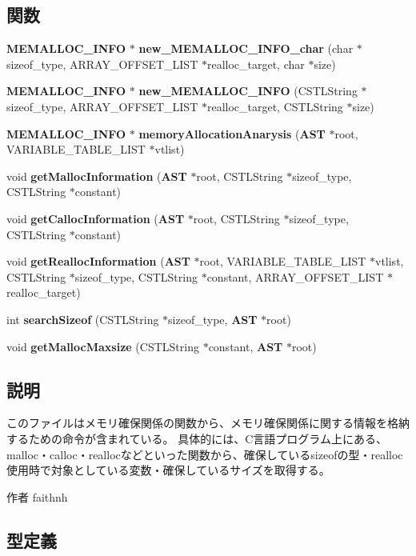 \subsection*{関数}
\begin{DoxyCompactItemize}
\item 
{\bf MEMALLOC\_\-INFO} $\ast$ {\bf new\_\-MEMALLOC\_\-INFO\_\-char} (char $\ast$sizeof\_\-type, ARRAY\_\-OFFSET\_\-LIST $\ast$realloc\_\-target, char $\ast$size)
\item 
{\bf MEMALLOC\_\-INFO} $\ast$ {\bf new\_\-MEMALLOC\_\-INFO} (CSTLString $\ast$sizeof\_\-type, ARRAY\_\-OFFSET\_\-LIST $\ast$realloc\_\-target, CSTLString $\ast$size)
\item 
{\bf MEMALLOC\_\-INFO} $\ast$ {\bf memoryAllocationAnarysis} ({\bf AST} $\ast$root, VARIABLE\_\-TABLE\_\-LIST $\ast$vtlist)
\item 
void {\bf getMallocInformation} ({\bf AST} $\ast$root, CSTLString $\ast$sizeof\_\-type, CSTLString $\ast$constant)
\item 
void {\bf getCallocInformation} ({\bf AST} $\ast$root, CSTLString $\ast$sizeof\_\-type, CSTLString $\ast$constant)
\item 
void {\bf getReallocInformation} ({\bf AST} $\ast$root, VARIABLE\_\-TABLE\_\-LIST $\ast$vtlist, CSTLString $\ast$sizeof\_\-type, CSTLString $\ast$constant, ARRAY\_\-OFFSET\_\-LIST $\ast$realloc\_\-target)
\item 
int {\bf searchSizeof} (CSTLString $\ast$sizeof\_\-type, {\bf AST} $\ast$root)
\item 
void {\bf getMallocMaxsize} (CSTLString $\ast$constant, {\bf AST} $\ast$root)
\end{DoxyCompactItemize}


\subsection{説明}
このファイルはメモリ確保関係の関数から、メモリ確保関係に関する情報を格納するための命令が含まれている。 具体的には、C言語プログラム上にある、malloc・calloc・reallocなどといった関数から、確保しているsizeofの型・realloc使用時で対象としている変数・確保しているサイズを取得する。 \begin{DoxyAuthor}{作者}
faithnh 
\end{DoxyAuthor}


\subsection{型定義}
